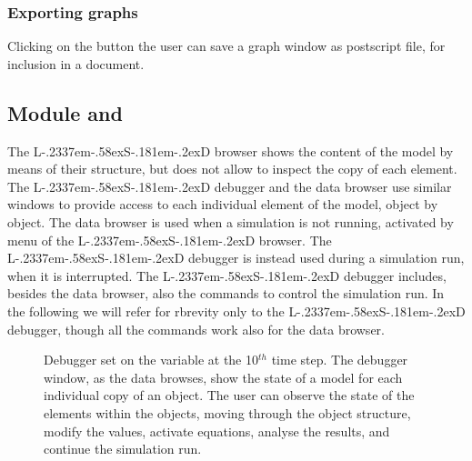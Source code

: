 \documentclass [11pt,a4paper] {book}
\def\LsD{{L\kern-.2337em\lower-.58ex\hbox{S}\kern-.181em\lower-.2ex\hbox{D}}\xspace}
\begin{document}
\subsubsection{Exporting graphs}
Clicking on the button  the user can save a graph window as postscript file, for inclusion in a document. 


\subsection{Module \menu{\LsD Debugger \xspace} and }\label{ssec:debugger}

The \LsD browser shows the content of the model by means of their structure, but does not allow to inspect the copy of each element. The \LsD debugger and the data browser use similar windows to provide access to each individual element of the model, object by object. The data browser is used when a simulation is not running, activated by menu  of the \LsD browser. The \LsD debugger is instead used during a simulation run, when it is interrupted. The \LsD debugger includes, besides the data browser, also the commands to control the simulation run. In the following we will refer for rbrevity only to the \LsD debugger, though all the commands work also for the data browser.


\begin{figure}[ht]
  \centering
  \caption{\small Debugger set on the variable  at the 10$^{th}$ time step. The debugger window, as the data browses, show the state of a model for each individual copy of an object. The user can observe the state of the elements within the objects, moving through the object structure, modify the values, activate equations, analyse the results, and continue the simulation run.}
  \label{fig:debugger2}
\end{figure}
\end{document}
